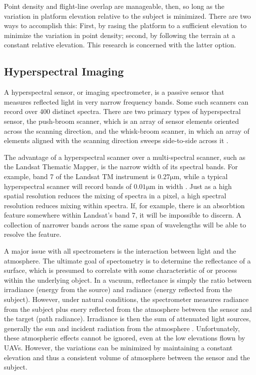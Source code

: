 \documentclass[10pt,a4paper]{report}
\begin{document}
Point density and flight-line overlap are manageable, then, so long as the variation in platform elevation relative to the subject is minimized. There are two ways to accomplish this: First, by rasing the platform to a sufficient elevation to minimize the variation in point density; second, by following the terrain at a constant relative elevation. This research is concerned with the latter option.

\subsection{Hyperspectral Imaging}

A hyperspectral sensor, or imaging spectrometer, is a passive sensor that measures reflected light in very narrow frequency bands. Some such scanners can record over 400 distinct spectra. There are two primary types of hyperspectral sensor, the push-broom scanner, which is an array of sensor elements oriented across the scanning direction, and the whisk-broom scanner, in which an array of elements aligned with the scanning direction sweeps side-to-side across it \cite{Lillesand1999}.

The advantage of a hyperspectral scanner over a multi-spectral scanner, such as the Landsat Thematic Mapper, is the narrow width of its spectral bands. For example, band 7 of the Landsat TM instrument is $0.27\si{\um}$, while a typical hyperspectral scanner will record bands of $0.01\si{\um}$ in width \cite{Lillesand1999}. Just as a high spatial resolution reduces the mixing of spectra in a pixel, a high spectral resolution reduces mixing within spectra. If, for example, there is an absorbtion feature somewhere within Landsat's band 7, it will be impossible to discern. A collection of narrower  bands across the same span of wavelengths will be able to resolve the feature.

A major issue with all spectrometers is the interaction between light and the atmosphere. The ultimate goal of spectometry is to determine the reflectance of a surface, which is presumed to correlate with some characteristic of or process within the underlying object. In a vacuum, reflectance is simply the ratio between irradiance (energy from the source) and radiance (energy reflected from the subject). However, under natural conditions, the spectrometer measures radiance from the subject plus enery reflected from the atmosphere between the sensor and the target (path radiance). Irradiance is then the sum of attenuated light sources, generally the sun and incident radiation from the atmosphere \cite{Lillesand1999}. Unfortunately, these atmospheric effects cannot be ignored, even at the low elevations flown by UAVs. However, the variations can be minimized by maintaining a constant elevation and thus a consistent volume of atmosphere between the sensor and the subject.
\end{document}

